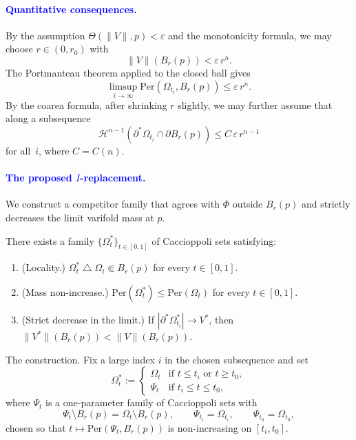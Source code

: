 \paragraph{\textcolor{blue}{Quantitative consequences.}}
By the assumption $\Theta(\|V\|, p) < \varepsilon$ and the monotonicity formula, we may choose $r \in (0, r_0)$ with
\begin{equation}\label{eq:strategy-V-small}
    \|V\|(B_r(p)) < \varepsilon\, r^n.
\end{equation}
The Portmanteau theorem applied to the closed ball gives
\begin{equation}\label{eq:strategy-Per-small}
    \limsup_{i \to \infty} \mathrm{Per}(\Omega_{t_i}, B_r(p)) \le \varepsilon\, r^n.
\end{equation}
By the coarea formula, after shrinking $r$ slightly, we may further assume that along a subsequence
\begin{equation}\label{eq:strategy-slice-small}
    \mathcal{H}^{n-1}(\partial^*\Omega_{t_i} \cap \partial B_r(p)) \le C\, \varepsilon\, r^{n-1}
\end{equation}
for all~$i$, where $C = C(n)$.

\paragraph{\textcolor{blue}{The proposed $I$-replacement.}}
We construct a competitor family that agrees with $\Phi$ outside $B_r(p)$ and strictly decreases the limit varifold mass at $p$.

\begin{claim}\label{claim:I-replacement}
There exists a family $\{\Omega^*_t\}_{t\in[0,1]}$ of Caccioppoli sets satisfying:
\begin{enumerate}[label=\textup{(\arabic*)}, leftmargin=2em]
    \item \textup{(Locality.)} $\Omega^*_t \mathbin{\triangle} \Omega_t \Subset B_r(p)$ for every $t \in [0,1]$.
    \item \textup{(Mass non-increase.)} $\mathrm{Per}(\Omega^*_t) \le \mathrm{Per}(\Omega_t)$ for every $t \in [0,1]$.
    \item \textup{(Strict decrease in the limit.)} If $|\partial^*\Omega^*_{t_i}| \to V^*$, then $\|V^*\|(B_r(p)) < \|V\|(B_r(p))$.
\end{enumerate}
\end{claim}

The construction. Fix a large index $i$ in the chosen subsequence and set
\[
    \Omega^*_t :=
    \begin{cases}
        \Omega_t & \text{if } t \le t_i \text{ or } t \ge t_0, \\
        \Psi_t & \text{if } t_i \le t \le t_0,
    \end{cases}
\]
where $\Psi_t$ is a one-parameter family of Caccioppoli sets with
\[
    \Psi_t \setminus B_r(p) = \Omega_t \setminus B_r(p), \qquad \Psi_{t_i} = \Omega_{t_i}, \qquad \Psi_{t_0} = \Omega_{t_0},
\]
chosen so that $t \mapsto \mathrm{Per}(\Psi_t, B_r(p))$ is non-increasing on $[t_i, t_0]$.

